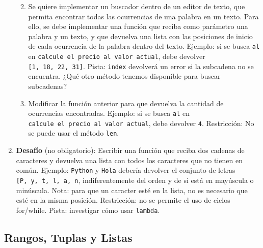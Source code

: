 \documentclass[
  letterpaper,
  DIV=11,
  numbers=noendperiod]{scrreprt}
\begin{document}
\begin{enumerate}
  \begin{enumerate}
  \def\labelenumii{\alph{enumii}.}
  \item
    Se quiere implementar un buscador dentro de un editor de texto, que
    permita encontrar todas las ocurrencias de una palabra en un texto.
    Para ello, se debe implementar una función que reciba como parámetro
    una palabra y un texto, y que devuelva una lista con las posiciones
    de inicio de cada ocurrencia de la palabra dentro del texto.
    Ejemplo: si se busca \texttt{\textquotesingle{}al\textquotesingle{}}
    en
    \texttt{\textquotesingle{}calcule\ el\ precio\ al\ valor\ actual\textquotesingle{}},
    debe devolver \texttt{{[}1,\ 18,\ 22,\ 31{]}}. Pista: \texttt{index}
    devolverá un error si la subcadena no se encuentra. ¿Qué otro método
    tenemos disponible para buscar subcadenas?
  \item
    Modificar la función anterior para que devuelva la cantidad de
    ocurrencias encontradas. Ejemplo: si se busca
    \texttt{\textquotesingle{}al\textquotesingle{}} en
    \texttt{\textquotesingle{}calcule\ el\ precio\ al\ valor\ actual\textquotesingle{}},
    debe devolver \texttt{4}. Restricción: No se puede usar el método
    \texttt{len}.
  \end{enumerate}
\item
  \textbf{Desafío} (no obligatorio): Escribir una función que reciba dos
  cadenas de caracteres y devuelva una lista con todos los caracteres
  que no tienen en común. Ejemplo:
  \texttt{\textquotesingle{}Python\textquotesingle{}} y
  \texttt{\textquotesingle{}Hola\textquotesingle{}} debería devolver el
  conjunto de letras
  \texttt{{[}\textquotesingle{}P\textquotesingle{},\ \textquotesingle{}y\textquotesingle{},\ \textquotesingle{}t\textquotesingle{},\ \textquotesingle{}l\textquotesingle{},\ \textquotesingle{}a\textquotesingle{},\ \textquotesingle{}n\textquotesingle{}{]}},
  indiferentemente del orden y de si está en mayúscula o minúscula.
  Nota: para que un caracter esté en la lista, no es necesario que esté
  en la misma posición. Restricción: no se permite el uso de ciclos
  for/while. Pista: investigar cómo usar \texttt{lambda}.
\end{enumerate}

\subsection*{Rangos, Tuplas y Listas}\label{rangos-tuplas-y-listas}
\end{document}
